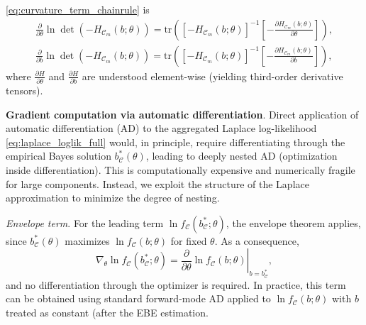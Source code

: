 \documentclass[12pt]{article}
\begin{document}
\eqref{eq:curvature_term_chainrule} is
\begin{equation}
\begin{aligned}
\label{eq:logdet_partials}
\frac{\partial}{\partial\theta}\ln\det\!\left(-H_{\mathcal{C}_m}(b;\theta)\right)
=
\mathrm{tr}\!\left(\left[-H_{\mathcal{C}_m}(b;\theta)\right]^{-1}\left[-\frac{\partial H_{\mathcal{C}_m}(b;\theta)}{\partial\theta}\right]\right), \\
\frac{\partial}{\partial b}\ln\det\!\left(-H_{\mathcal{C}_m}(b;\theta)\right)
=
\mathrm{tr}\!\left(\left[-H_{\mathcal{C}_m}(b;\theta)\right]^{-1}\left[-\frac{\partial H_{\mathcal{C}_m}(b;\theta)}{\partial b}\right]\right),
\end{aligned}
\end{equation}
where \(\frac{\partial H}{\partial\theta}\) and \(\frac{\partial H}{\partial b}\) are understood element-wise (yielding third-order derivative tensors).

\textbf{Gradient computation via automatic differentiation}. 
Direct application of automatic differentiation (AD) to the aggregated Laplace log-likelihood
\eqref{eq:laplace_loglik_full} would, in principle, require differentiating through the empirical Bayes solution
\(b_{\mathcal{C}}^*(\theta)\), leading to deeply nested AD (optimization inside differentiation).
This is computationally expensive and numerically fragile for large components.
Instead, we exploit the structure of the Laplace approximation to minimize the degree of nesting.

\medskip
\noindent
\emph{Envelope term}.  
For the leading term \(\ln f_{\mathcal{C}}(b_{\mathcal{C}}^*;\theta)\), the envelope theorem applies, since
\(b_{\mathcal{C}}^*(\theta)\) maximizes \(\ln f_{\mathcal{C}}(b;\theta)\) for fixed \(\theta\).
As a consequence,
\[
\nabla_\theta \ln f_{\mathcal{C}}(b_{\mathcal{C}}^*;\theta)
=
\left.\frac{\partial}{\partial\theta}\ln f_{\mathcal{C}}(b;\theta)\right\rvert_{b=b_{\mathcal{C}}^*},
\]
and no differentiation through the optimizer is required.
In practice, this term can be obtained using standard forward-mode AD applied to
\(\ln f_{\mathcal{C}}(b;\theta)\) with \(b\) treated as constant (after the EBE estimation.
\end{document}
